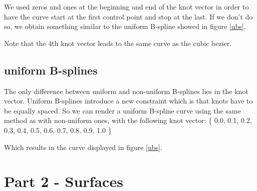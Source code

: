 
We used zeros and ones at the beginning and end of the knot vector in order to have
the curve start at the first control point and stop at the last. If we don't do so,
we obtain something similar to the uniform B-spline showed in figure \ref{ubs}.

Note that the 4th knot vector leads to the same curve as the cubic bezier.

\subsection{uniform B-splines}
The only difference between uniform and non-uniform B-splines lies in the knot vector.
Uniform B-splines introduce a new constraint which is that knots have to be equally
spaced. So we can render a uniform B-spline curve using the same method as with
non-uniform ones, with the following knot vector:
\{ 0.0, 0.1, 0.2, 0.3, 0.4, 0.5, 0.6, 0.7, 0.8, 0.9, 1.0 \}

Which results in the curve displayed in figure \ref{ubs}.


\section{Part 2 - Surfaces}
